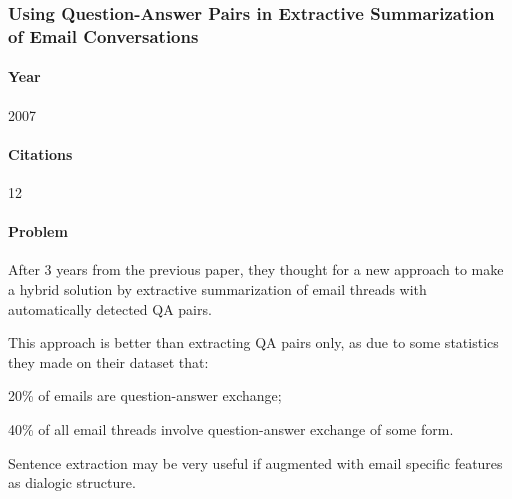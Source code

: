 \documentclass[12pt]{article}
\newenvironment{my_itemize}
{\begin{itemize}
  \setlength{\itemsep}{0cm}
  \setlength{\parskip}{0cm}}
{\end{itemize}}
\begin{document}

\subsubsection{Using Question-Answer Pairs in Extractive Summarization of Email Conversations \cite{KATHLEEN07}}

\paragraph{Year} 2007
\paragraph{Citations} 12

\paragraph{Problem}
\begin{my_itemize}
  \item After 3 years from the previous paper, they thought for a new approach 
	to make a hybrid solution by extractive summarization of email threads 
	with automatically detected QA pairs.
  \item This approach is better than extracting QA pairs only, as due to some 
	statistics they made on their dataset that:
  \begin{my_itemize}
    \item 20\% of emails are question-answer exchange;
    \item 40\% of all email threads involve question-answer exchange of some form.
  \end{my_itemize}
  \item Sentence extraction may be very useful if augmented with email specific 
	features as dialogic structure.
\end{my_itemize}
\end{document}
